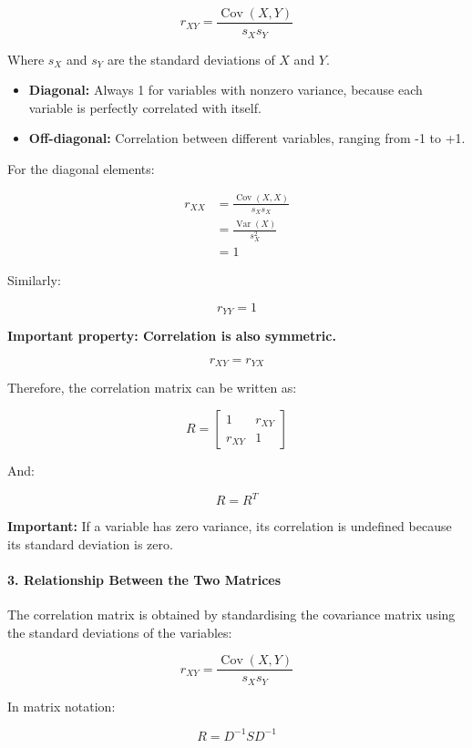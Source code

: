 \documentclass[11pt]{article}
\providecommand{\tightlist}{%
      \setlength{\itemsep}{0pt}\setlength{\parskip}{0pt}}
\begin{document}
\[
r_{XY} =
\frac{\operatorname{Cov}(X,Y)}{s_Xs_Y}
\]

Where \(s_X\) and \(s_Y\) are the standard deviations of \(X\) and
\(Y\).

\begin{itemize}
\tightlist
\item
  \textbf{Diagonal:} Always 1 for variables with nonzero variance,
  because each variable is perfectly correlated with itself.
\item
  \textbf{Off-diagonal:} Correlation between different variables,
  ranging from -1 to +1.
\end{itemize}

For the diagonal elements:

\[
\begin{aligned}
r_{XX}
&=\frac{\operatorname{Cov}(X,X)}{s_Xs_X}\\[6pt]
&=\frac{\operatorname{Var}(X)}{s_X^2}\\[6pt]
&=\boxed{1}
\end{aligned}
\]

Similarly:

\[
r_{YY}=1
\]

\textbf{Important property: Correlation is also symmetric.}

\[
\boxed{r_{XY}=r_{YX}}
\]

Therefore, the correlation matrix can be written as:

\[
R =
\begin{bmatrix}
1 & r_{XY} \\
r_{XY} & 1
\end{bmatrix}
\]

And:

\[
\boxed{R=R^T}
\]

\textbf{Important:} If a variable has zero variance, its correlation is
undefined because its standard deviation is zero.

\paragraph{3. Relationship Between the Two
Matrices}\label{relationship-between-the-two-matrices}

The correlation matrix is obtained by standardising the covariance
matrix using the standard deviations of the variables:

\[
\boxed{
r_{XY} =
\frac{\operatorname{Cov}(X,Y)}{s_Xs_Y}
}
\]

In matrix notation:

\[
\boxed{R=D^{-1}SD^{-1}}
\]
\end{document}
